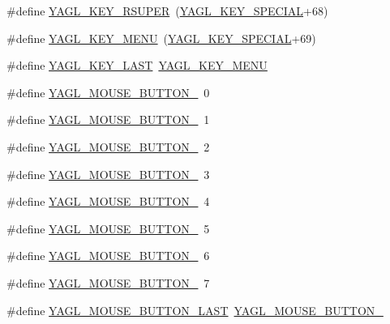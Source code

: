 \begin{DoxyCompactItemize}
\item 
\#define \hyperlink{group____consts__key__mouse_gae8d14a7c3466bba4ff941b0c876f3ac8}{Y\-A\-G\-L\-\_\-\-K\-E\-Y\-\_\-\-R\-S\-U\-P\-E\-R}~(\hyperlink{group____consts__key__mouse_gae6060c5e0a8f15c67d28e1a1f0765d7b}{Y\-A\-G\-L\-\_\-\-K\-E\-Y\-\_\-\-S\-P\-E\-C\-I\-A\-L}+68)
\item 
\#define \hyperlink{group____consts__key__mouse_ga18e8131abeb5168a42c4336fdc8602db}{Y\-A\-G\-L\-\_\-\-K\-E\-Y\-\_\-\-M\-E\-N\-U}~(\hyperlink{group____consts__key__mouse_gae6060c5e0a8f15c67d28e1a1f0765d7b}{Y\-A\-G\-L\-\_\-\-K\-E\-Y\-\_\-\-S\-P\-E\-C\-I\-A\-L}+69)
\item 
\#define \hyperlink{group____consts__key__mouse_ga7e730f2a11f73dc5c4b275d925e65509}{Y\-A\-G\-L\-\_\-\-K\-E\-Y\-\_\-\-L\-A\-S\-T}~\hyperlink{group____consts__key__mouse_ga18e8131abeb5168a42c4336fdc8602db}{Y\-A\-G\-L\-\_\-\-K\-E\-Y\-\_\-\-M\-E\-N\-U}
\item 
\#define \hyperlink{group____consts__key__mouse_ga08367b01f0dc87f21660857cc11a66e7}{Y\-A\-G\-L\-\_\-\-M\-O\-U\-S\-E\-\_\-\-B\-U\-T\-T\-O\-N\-\_}~0
\item 
\#define \hyperlink{group____consts__key__mouse_gade4edcc8b61aac75dc1d3056c0272635}{Y\-A\-G\-L\-\_\-\-M\-O\-U\-S\-E\-\_\-\-B\-U\-T\-T\-O\-N\-\_}~1
\item 
\#define \hyperlink{group____consts__key__mouse_gaa8a1dc5364ad7724455d8b8b26168d9e}{Y\-A\-G\-L\-\_\-\-M\-O\-U\-S\-E\-\_\-\-B\-U\-T\-T\-O\-N\-\_}~2
\item 
\#define \hyperlink{group____consts__key__mouse_ga441707fa5337c3976e1a40c768b55025}{Y\-A\-G\-L\-\_\-\-M\-O\-U\-S\-E\-\_\-\-B\-U\-T\-T\-O\-N\-\_}~3
\item 
\#define \hyperlink{group____consts__key__mouse_ga4e1f7f7b6ad36433c970cc065da814be}{Y\-A\-G\-L\-\_\-\-M\-O\-U\-S\-E\-\_\-\-B\-U\-T\-T\-O\-N\-\_}~4
\item 
\#define \hyperlink{group____consts__key__mouse_ga07d70d386e3ff46adf296a2d4cf358bb}{Y\-A\-G\-L\-\_\-\-M\-O\-U\-S\-E\-\_\-\-B\-U\-T\-T\-O\-N\-\_}~5
\item 
\#define \hyperlink{group____consts__key__mouse_ga0c7572750424556b085b0d7d851888bb}{Y\-A\-G\-L\-\_\-\-M\-O\-U\-S\-E\-\_\-\-B\-U\-T\-T\-O\-N\-\_}~6
\item 
\#define \hyperlink{group____consts__key__mouse_gae382a80b34668936df6a4eac97e2a9b1}{Y\-A\-G\-L\-\_\-\-M\-O\-U\-S\-E\-\_\-\-B\-U\-T\-T\-O\-N\-\_}~7
\item 
\#define \hyperlink{group____consts__key__mouse_ga33d527491007b304ca1e50496c3cdb03}{Y\-A\-G\-L\-\_\-\-M\-O\-U\-S\-E\-\_\-\-B\-U\-T\-T\-O\-N\-\_\-\-L\-A\-S\-T}~\hyperlink{group____consts__key__mouse_gae382a80b34668936df6a4eac97e2a9b1}{Y\-A\-G\-L\-\_\-\-M\-O\-U\-S\-E\-\_\-\-B\-U\-T\-T\-O\-N\-\_}

\end{DoxyCompactItemize}

